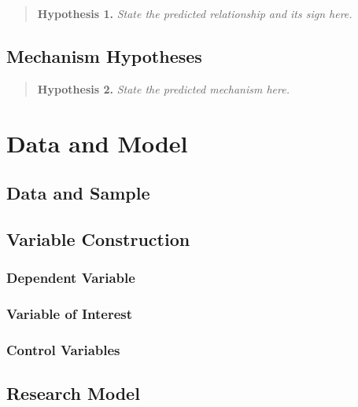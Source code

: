 \documentclass[../main.tex]{subfiles}
\begin{document}
\begin{quote}
\textbf{Hypothesis 1.} \textit{State the predicted relationship and its
sign here.}
\end{quote}

\subsection{Mechanism Hypotheses}
\lipsum[11]

\begin{quote}
\textbf{Hypothesis 2.} \textit{State the predicted mechanism here.}
\end{quote}

\section{Data and Model}\label{sec:ch1-data}

\subsection{Data and Sample}
\lipsum[12]

\subsection{Variable Construction}

\subsubsection{Dependent Variable}
\lipsum[13]

\subsubsection{Variable of Interest}
\lipsum[14]

\subsubsection{Control Variables}
\lipsum[15]

\subsection{Research Model}
\end{document}
